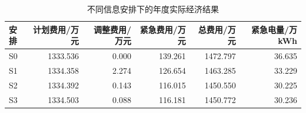 \begin{table}[H]
\centering\small
\caption{不同信息安排下的年度实际经济结果}
\label{tab:q3-schedule-comparison}
\begin{tabular}{lrrrrr}
\toprule
安排 & 计划费用/万元 & 调整费用/万元 & 紧急费用/万元 & 总费用/万元 & 紧急电量/万kWh \\
\midrule
S0 & 1333.536 & 0.000 & 139.261 & 1472.797 & 36.635 \\
S1 & 1334.358 & 2.274 & 126.654 & 1463.285 & 33.229 \\
S2 & 1334.392 & 0.143 & 116.015 & 1450.550 & 30.225 \\
S3 & 1334.503 & 0.088 & 116.181 & 1450.772 & 30.236 \\
\bottomrule
\end{tabular}
\end{table}
